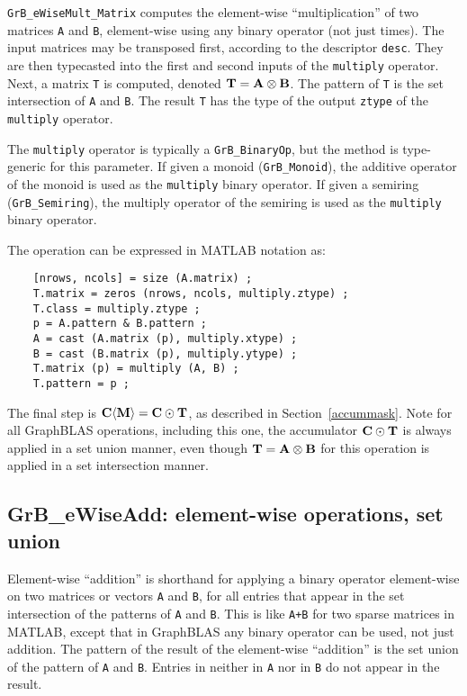 \documentclass[12pt]{article}
\begin{document}
\verb'GrB_eWiseMult_Matrix' computes the element-wise ``multiplication'' of two
matrices \verb'A' and \verb'B', element-wise using any binary operator (not
just times).  The input matrices may be transposed first, according to the
descriptor \verb'desc'.  They are then typecasted into the first and second
inputs of the \verb'multiply' operator.  Next, a matrix \verb'T' is computed,
denoted ${\bf T = A \otimes B}$.  The pattern of \verb'T' is the set
intersection of \verb'A' and \verb'B'.  The result \verb'T' has the type of the
output \verb'ztype' of the \verb'multiply' operator.

The \verb'multiply' operator is typically a \verb'GrB_BinaryOp', but the method
is type-generic for this parameter.  If given a monoid (\verb'GrB_Monoid'), the
additive operator of the monoid is used as the \verb'multiply' binary operator.
If given a semiring (\verb'GrB_Semiring'), the multiply operator of the
semiring is used as the \verb'multiply' binary operator.

\vspace{0.05in}
The operation can be expressed in MATLAB notation as:
    {\footnotesize
    \begin{verbatim}
    [nrows, ncols] = size (A.matrix) ;
    T.matrix = zeros (nrows, ncols, multiply.ztype) ;
    T.class = multiply.ztype ;
    p = A.pattern & B.pattern ;
    A = cast (A.matrix (p), multiply.xtype) ;
    B = cast (B.matrix (p), multiply.ytype) ;
    T.matrix (p) = multiply (A, B) ;
    T.pattern = p ; \end{verbatim} }

The final step is ${\bf C \langle M \rangle  = C \odot T}$, as described in
Section~\ref{accummask}.  Note for all GraphBLAS operations, including this
one, the accumulator ${\bf C \odot T}$ is always applied in a set union manner,
even though ${\bf T = A \otimes B}$ for this operation is applied in a set
intersection manner.

\newpage
\subsection{{\sf GrB\_eWiseAdd:} element-wise operations, set union} %
\label{eWiseAdd}

Element-wise ``addition'' is shorthand for applying a binary operator
element-wise on two matrices or vectors \verb'A' and \verb'B', for all entries
that appear in the set intersection of the patterns of \verb'A' and \verb'B'.
This is like \verb'A+B' for two sparse matrices in MATLAB, except that in
GraphBLAS any binary operator can be used, not just addition.  The pattern of
the result of the element-wise ``addition'' is the set union of the pattern of
\verb'A' and \verb'B'.  Entries in neither in \verb'A' nor in \verb'B' do
not appear in the result.
\end{document}

